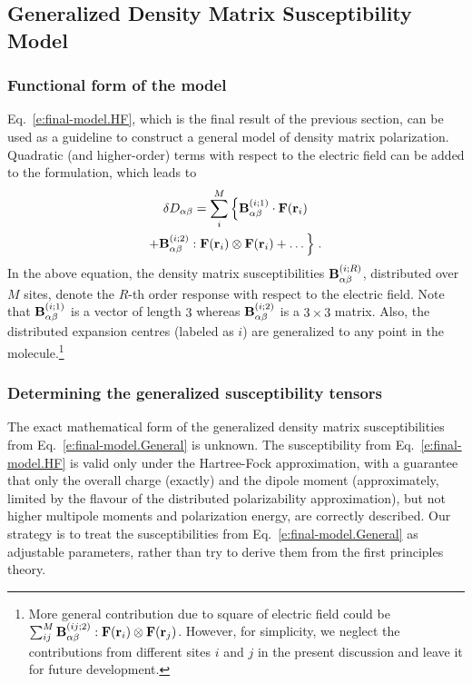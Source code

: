 \documentclass[aip,amsmath,amssymb,reprint,floatfix]{revtex4-1}
\begin{document}
\subsection{Generalized Density Matrix Susceptibility Model}

\subsubsection{Functional form of the model}

Eq.~\eqref{e:final-model.HF}, which is the final result of the previous section, 
can be used as a guideline to construct a general model of density matrix polarization.
Quadratic (and higher\hyp{}order) terms with respect to the electric field
can be added to the formulation, which leads to
%
\begin{multline}\label{e:final-model.General}
 \delta D_{\alpha\beta} = \sum_{i }^M \Big\{
                                      {\bf B}^{(i ; 1)}_{\alpha\beta} \cdot {\bf F}({\bf r}_i)  \\
                        +             {\bf B}^{(i ; 2)}_{\alpha\beta} : {\bf F}({\bf r}_i) \otimes {\bf F}({\bf r}_i) 
                        + \ldots \Big\} \;.
\end{multline}
%
In the above equation, the density matrix susceptibilities
${\bf B}^{(i; R)}_{\alpha\beta}$, distributed over $M$ sites,
denote the $R$-th order response with respect to the electric field.
Note that
${\bf B}^{(i; 1)}_{\alpha\beta}$ is a vector of length $3$ whereas ${\bf B}^{(i; 2)}_{\alpha\beta}$
is a $3\times 3$ matrix. Also, the distributed expansion centres
(labeled as $i$) are generalized to any point in the molecule.\footnote{More general
contribution due to square of electric field could 
be $\sum_{ij}^M {\bf B}^{(ij; 2)}_{\alpha\beta} : {\bf F}({\bf r}_i) \otimes {\bf F}({\bf r}_j)$. 
However, for simplicity, we neglect the contributions from different sites $i$ and $j$
in the present discussion and leave it for future development.
}

\subsubsection{Determining the generalized susceptibility tensors}

The exact mathematical form of the generalized density matrix susceptibilities 
from Eq.~\eqref{e:final-model.General} is unknown. 
The susceptibility from Eq.~\eqref{e:final-model.HF} is valid only under the Hartree\hyp{}Fock
approximation, with a guarantee that only the overall charge (exactly) and the dipole moment (approximately,
limited by the flavour of the distributed polarizability approximation), 
but not higher multipole moments and polarization energy, are correctly described.
Our strategy is to treat the susceptibilities from Eq.~\eqref{e:final-model.General}
as adjustable parameters, rather than try to derive them from the first principles theory.
\end{document}
